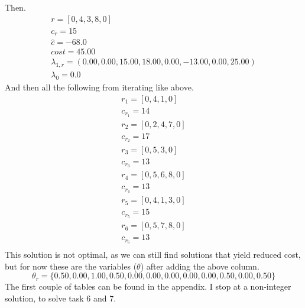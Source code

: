 \documentclass{article}
\begin{document}
    Then.
    \begin{equation*}
        \begin{array}{c}
            r = [0, 4, 3, 8, 0]\\
            c_r = 15\\
            \hat{c} = -68.0\\
            cost = 45.00\\
            \lambda_{1,r} = (0.00,0.00,15.00,18.00,0.00,-13.00,0.00,25.00)\\
            \lambda_0 = 0.0
        \end{array}
    \end{equation*}
    And then all the following from iterating like above.
    \begin{equation*}
        \begin{array}{c}
            r_1 = [0, 4, 1, 0]\\
            c_{r_1} = 14\\
            r_2 = [0, 2, 4, 7, 0]\\
            c_{r_2} = 17\\
            r_3 = [0, 5, 3, 0]\\
            c_{r_3} = 13\\
            r_4 = [0, 5, 6, 8, 0]\\
            c_{r_4} = 13\\
            r_5 = [0, 4, 1, 3, 0]\\
            c_{r_5} = 15\\
            r_6 = [0, 5, 7, 8, 0]\\
            c_{r_6} = 13\\
        \end{array}
    \end{equation*}
    This solution is not optimal, as we can still find solutions that yield reduced cost, but for now these are the variables ($\theta$) after adding the above column.
    \[
        \theta_r = \{0.50, 0.00, 1.00, 0.50, 0.00, 0.00, 0.00, 0.00, 0.00, 0.50, 0.00, 0.50 \}
    \]
    The first couple of tables can be found in the appendix.
    I stop at a non-integer solution, to solve task 6 and 7.
\end{document}
